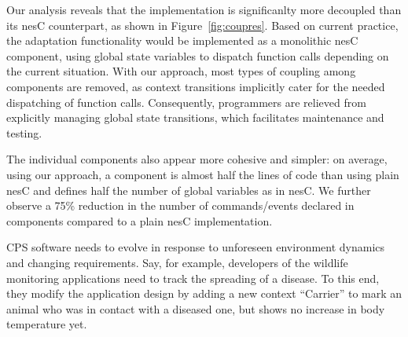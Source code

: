  Our analysis reveals that the
\conesc implementation is significanlty more decoupled than its nesC
counterpart, as shown in Figure~\ref{fig:coupres}. Based on current
practice, the adaptation functionality would be implemented as a
monolithic nesC component, using global state variables to dispatch
function calls depending on the current situation. With our approach,
most types of coupling among components are removed, as context
transitions implicitly cater for the needed dispatching of function
calls. Consequently, programmers are relieved from explicitly managing
global state transitions, which facilitates maintenance and testing.

The individual \conesc components also appear more
cohesive and simpler: on average, using our approach, a component is
almost half the lines of code than using plain nesC and defines half
the number of global variables as in nesC. We further observe a 75\%
reduction in the number of commands/events declared in \conesc
components compared to a plain nesC implementation.



 CPS software needs to
evolve in response to unforeseen environment dynamics and changing
requirements. Say, for example, developers of the wildlife monitoring
applications need to track the spreading of a disease. To this
end, they modify the application design by adding a new context
``Carrier'' to mark an animal who was in contact with a diseased one,
but shows no increase in body temperature yet. 

